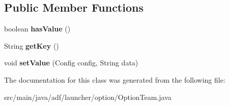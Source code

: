 \subsection*{Public Member Functions}
\begin{DoxyCompactItemize}
\item 
\hypertarget{classadf_1_1launcher_1_1option_1_1OptionTeam_a60e2d433ec655cd2fdba6ed021b8ee16}{}\label{classadf_1_1launcher_1_1option_1_1OptionTeam_a60e2d433ec655cd2fdba6ed021b8ee16} 
boolean {\bfseries has\+Value} ()
\item 
\hypertarget{classadf_1_1launcher_1_1option_1_1OptionTeam_a1d4a084b0338528376ca2aa7eb340402}{}\label{classadf_1_1launcher_1_1option_1_1OptionTeam_a1d4a084b0338528376ca2aa7eb340402} 
String {\bfseries get\+Key} ()
\item 
\hypertarget{classadf_1_1launcher_1_1option_1_1OptionTeam_ab03902d3df21ad51767c0d6331c5dbef}{}\label{classadf_1_1launcher_1_1option_1_1OptionTeam_ab03902d3df21ad51767c0d6331c5dbef} 
void {\bfseries set\+Value} (Config config, String data)
\end{DoxyCompactItemize}


The documentation for this class was generated from the following file\+:\begin{DoxyCompactItemize}
\item 
src/main/java/adf/launcher/option/Option\+Team.\+java\end{DoxyCompactItemize}
